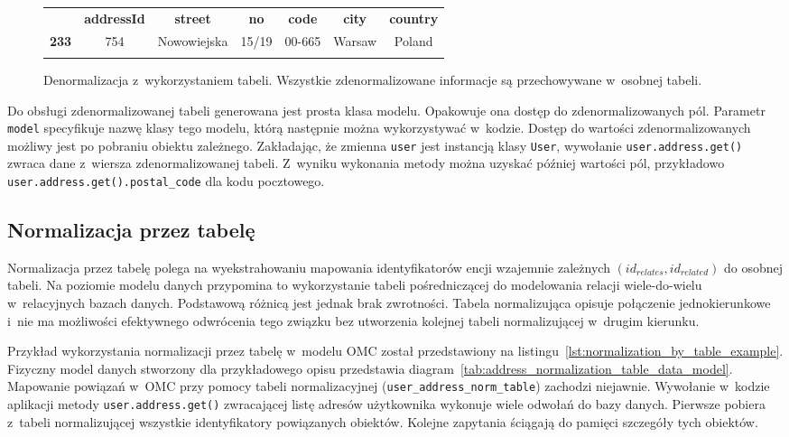 \begin{figure}[ht!]
	\centering

	\begin{tabular}{|l||c|c|c|c|c|c|}
		\hhline{|-||------|}
		 & \textbf{addressId} & \textbf{street} & \textbf{no} & \textbf{code} & \textbf{city} & \textbf{country} \\
		\hhline{|~||======|}
		\textbf{233} & 754 & Nowowiejska & 15/19 & 00-665 & Warsaw & Poland \\
		\hhline{|-||------|}
	\end{tabular} 

	\caption{Denormalizacja z~wykorzystaniem tabeli. Wszystkie zdenormalizowane informacje są przechowywane w~osobnej tabeli.}
	\label{tab:address_denormalization_by_table_example}
\end{figure}

Do obsługi zdenormalizowanej tabeli generowana jest prosta klasa modelu. Opakowuje ona dostęp do zdenormalizowanych pól. Parametr \verb+model+ specyfikuje nazwę klasy tego modelu, którą następnie można wykorzystywać w~kodzie. Dostęp do wartości zdenormalizowanych możliwy jest po pobraniu obiektu zależnego. Zakładając, że zmienna \verb+user+ jest instancją klasy \verb+User+, wywołanie \verb+user.address.get()+ zwraca dane z~wiersza zdenormalizowanej tabeli. Z~wyniku wykonania metody można uzyskać później wartości pól, przykładowo \verb+user.address.get().postal_code+ dla kodu pocztowego. 

\subsection{Normalizacja przez tabelę}
\label{sec:normalization_by_table}

Normalizacja przez tabelę polega na wyekstrahowaniu mapowania identyfikatorów encji wzajemnie zależnych $(id_{relates}, id_{related})$ do osobnej tabeli. Na poziomie modelu danych przypomina to wykorzystanie tabeli pośredniczącej do modelowania relacji wiele-do-wielu w~relacyjnych bazach danych. Podstawową różnicą jest jednak brak zwrotności. Tabela normalizująca opisuje połączenie jednokierunkowe i~nie ma możliwości efektywnego odwrócenia tego związku bez utworzenia kolejnej tabeli normalizującej w~drugim kierunku.

Przykład wykorzystania normalizacji przez tabelę w~modelu OMC został przedstawiony na listingu~\ref{lst:normalization_by_table_example}. Fizyczny model danych stworzony dla przykładowego opisu przedstawia diagram~\ref{tab:address_normalization_table_data_model}. Mapowanie powiązań w~OMC przy pomocy tabeli normalizacyjnej (\verb+user_address_norm_table+) zachodzi niejawnie. Wywołanie w~kodzie aplikacji metody \verb+user.address.get()+ zwracającej listę adresów użytkownika wykonuje wiele odwołań do bazy danych. Pierwsze pobiera z~tabeli normalizującej wszystkie identyfikatory powiązanych obiektów. Kolejne zapytania ściągają do pamięci szczegóły tych obiektów.

